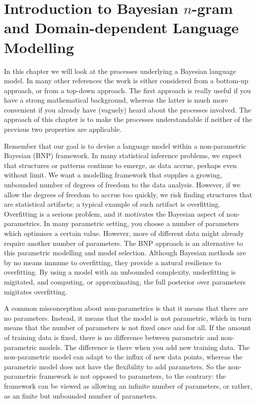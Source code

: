 \chapter{Introduction to Bayesian $n$-gram and Domain-dependent Language Modelling}

In this chapter we will look at the processes underlying a Bayesian language model. In many other references the work is either considered from a bottom-up approach, or from a top-down approach. The first approach is really useful if you have a strong mathematical background, whereas the latter is much more convenient if you already have (vaguely) heard about the processes involved. The approach of this chapter is to make the processes understandable if neither of the previous two properties are applicable.

Remember that our goal is to devise a language model within a non-parametric Bayesian (BNP) framework. In many statistical inference problems, we expect that structures or patterns continue to emerge, as data accrue, perhaps even without limit. We want a modelling framework that supplies a growing, unbounded number of degrees of freedom to the data analysis. However, if we allow the degrees of freedom to accrue too quickly, we risk finding structures that are statistical artifacts; a typical example of such artifact is overfitting. Overfitting is a serious problem, and it motivates the Bayesian aspect of non-parametrics. In many parametric setting, you choose a number of parameters which optimises a certain value. However, more of different data might already require another number of parameters. The BNP approach is an alternative to this parametric modelling and model selection. Although Bayesian methods are by no means immune to overfitting, they provide a natural resilience to overfitting. By using a model with an unbounded complexity, underfitting is migitated, and computing, or approximating, the full posterior over parameters migitates overfitting.

A common misconception about non-parametrics is that it means that there are no parameters. Instead, it means that the model is not parametric, which in turn means that the number of parameters is not fixed once and for all. If the amount of training data is fixed, there is no difference between parametric and non-parametric models. The difference is there when you add new training data. The non-parametric model can adapt to the influx of new data points, whereas the parametric model does not have the flexibility to add parameters. So the non-parametric framework is not opposed to parameters, to the contrary: the framework can be viewed as allowing an infinite number of parameters, or rather, as an finite but unbounded number of parameters.


